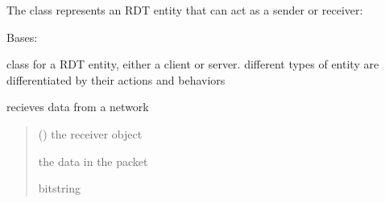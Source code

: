 \documentclass[letterpaper,10pt,english,openany,oneside]{sphinxmanual}
\begin{document}
\sphinxAtStartPar
The  class represents an RDT entity that can act as a sender or receiver:

\begin{fulllineitems}
\label{\detokenize{index:rdt_protocol.ReliableDataTransferEntity}}
\pysigstartsignatures
\pysiglinewithargsret
{}
{\sphinxparamcomma {}\sphinxparamcomma {}\sphinxparamcomma {}}
{}
\pysigstopsignatures
\sphinxAtStartPar
Bases: 

\sphinxAtStartPar
class for a RDT entity, either a client or server. different types of entity are differentiated by
their actions and behaviors

\begin{fulllineitems}
\label{\detokenize{index:rdt_protocol.ReliableDataTransferEntity.receive}}
\pysigstartsignatures
\pysiglinewithargsret
{}
{}
{}
\pysigstopsignatures
\sphinxAtStartPar
recieves data from a network
\begin{quote}\begin{description}
\sphinxAtStartPar
{} ({\hyperref[\detokenize{index:rdt_protocol.ReliableDataTransferEntity}]{}}) \textendash{} the receiver object

\sphinxAtStartPar
the data in the packet

\sphinxAtStartPar
bitstring

\end{description}\end{quote}

\end{fulllineitems}


\end{fulllineitems}
\end{document}

